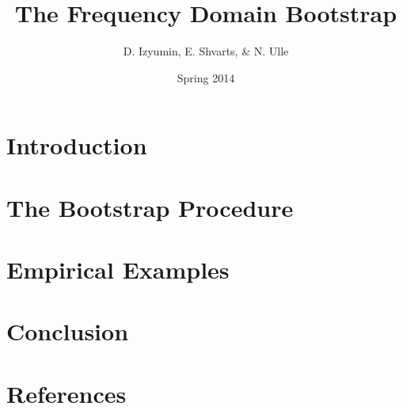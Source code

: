 \documentclass{article}
\title{The Frequency Domain Bootstrap}
\author{D. Izyumin, E. Shvarts, \& N. Ulle}
\date{Spring 2014}
\newcommand{\1}{ \vec{1} }
\begin{document}
\maketitle

\section*{Introduction}
%

\section*{The Bootstrap Procedure}
%

\section*{Empirical Examples}


\section*{Conclusion}

\section*{References}

\end{document}
